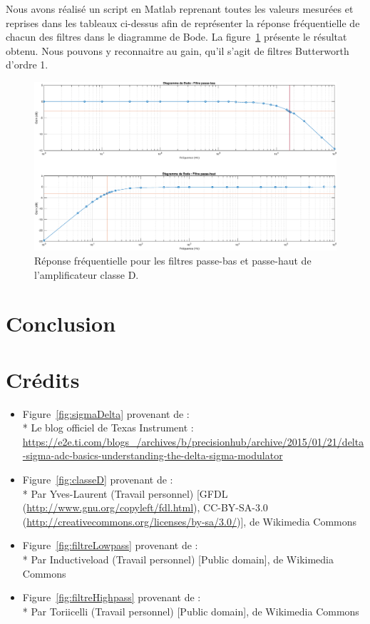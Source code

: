 \documentclass[10pt, oneside, a4paper]{article}
\begin{document}
Nous avons réalisé un script en Matlab\textregistered{} reprenant toutes les valeurs mesurées et reprises dans les tableaux ci-dessus afin de représenter la réponse fréquentielle de chacun des filtres dans le diagramme de Bode.
La figure~\ref{fig:resultatRepFreq} présente le résultat obtenu.
Nous pouvons y reconnaitre au gain, qu'il s'agit de filtres Butterworth d'ordre 1.
\begin{figure}[!ht]
    \centering
    \includegraphics[width=\textwidth]{eps/bode-filtres.eps}
    \caption{Réponse fréquentielle pour les filtres passe-bas
             et passe-haut de l'amplificateur classe D.}
    \label{fig:resultatRepFreq}
\end{figure}


\section*{Conclusion}


\section*{Crédits}
    
\begin{itemize}
\item Figure~\ref{fig:sigmaDelta} provenant de :\\*
Le blog officiel de Texas Instrument :
\url{https://e2e.ti.com/blogs_/archives/b/precisionhub/archive/2015/01/21/delta-sigma-adc-basics-understanding-the-delta-sigma-modulator}

\item Figure~\ref{fig:classeD} provenant de :\\*
Par Yves-Laurent (Travail personnel) [GFDL (\url{http://www.gnu.org/copyleft/fdl.html}),
CC-BY-SA-3.0 (\url{http://creativecommons.org/licenses/by-sa/3.0/})], de Wikimedia Commons

\item Figure~\ref{fig:filtreLowpass} provenant de :\\*
Par Inductiveload (Travail personnel) [Public domain], de Wikimedia Commons

\item Figure~\ref{fig:filtreHighpass} provenant de :\\*
Par Toriicelli (Travail personnel) [Public domain], de Wikimedia Commons
\end{itemize}
\end{document}
